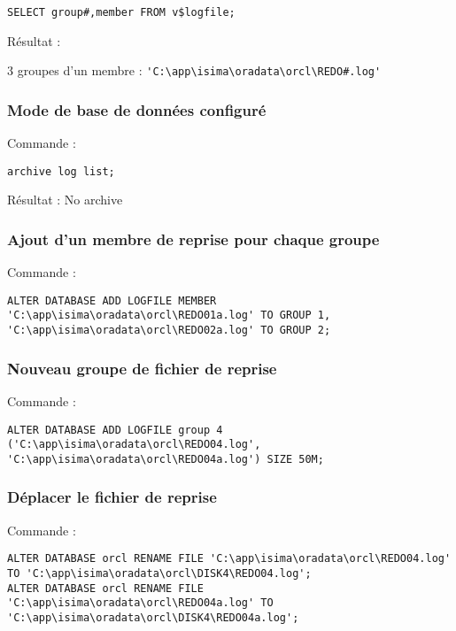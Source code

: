 \begin{verbatim}
SELECT group#,member FROM v$logfile;
\end{verbatim}

Résultat : 

3 groupes d'un membre :  \verb|'C:\app\isima\oradata\orcl\REDO#.log'|

\subsubsection{Mode de base de données configuré}

Commande :
\begin{verbatim}
archive log list;
\end{verbatim}

Résultat : No archive

\subsubsection{Ajout d'un membre de reprise pour chaque groupe}

Commande : 
\begin{verbatim}
ALTER DATABASE ADD LOGFILE MEMBER 'C:\app\isima\oradata\orcl\REDO01a.log' TO GROUP 1, 'C:\app\isima\oradata\orcl\REDO02a.log' TO GROUP 2;
\end{verbatim}

\subsubsection{Nouveau groupe de fichier de reprise}

Commande : 
\begin{verbatim}
ALTER DATABASE ADD LOGFILE group 4 ('C:\app\isima\oradata\orcl\REDO04.log', 'C:\app\isima\oradata\orcl\REDO04a.log') SIZE 50M;
\end{verbatim}

\subsubsection{Déplacer le fichier de reprise}

Commande : 
\begin{verbatim}
ALTER DATABASE orcl RENAME FILE 'C:\app\isima\oradata\orcl\REDO04.log' TO 'C:\app\isima\oradata\orcl\DISK4\REDO04.log';
ALTER DATABASE orcl RENAME FILE 'C:\app\isima\oradata\orcl\REDO04a.log' TO 'C:\app\isima\oradata\orcl\DISK4\REDO04a.log';
\end{verbatim}

